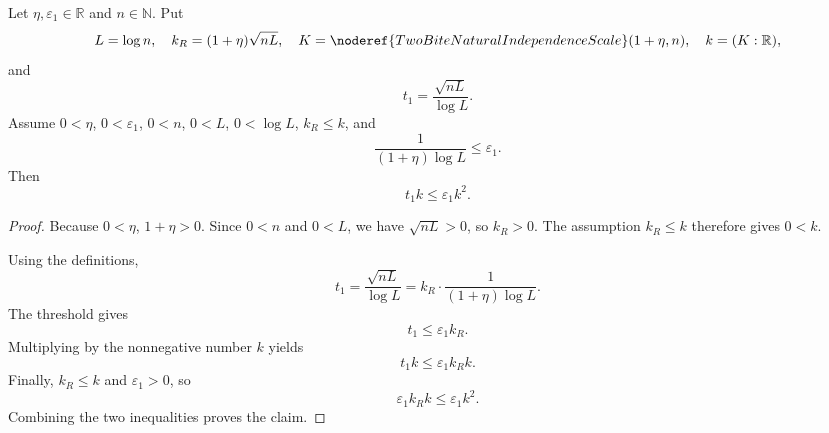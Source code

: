 \begin{helper}
Let \(\eta,\varepsilon_1\in\mathbb R\) and \(n\in\mathbb N\).  Put
\[
L=\log n,\quad
k_R=(1+\eta)\sqrt{nL},\quad
K=\noderef{TwoBiteNaturalIndependenceScale}(1+\eta,n),\quad
k=(K:\mathbb R),
\]
and
\[
t_1=\frac{\sqrt{nL}}{\log L}.
\]
Assume \(0<\eta\), \(0<\varepsilon_1\), \(0<n\), \(0<L\), \(0<\log L\),
\(k_R\le k\), and
\[
\frac1{(1+\eta)\log L}\le\varepsilon_1.
\]
Then
\[
t_1k\le\varepsilon_1 k^2.
\]
\end{helper}
\begin{proof}
Because \(0<\eta\), \(1+\eta>0\).  Since \(0<n\) and \(0<L\), we have
\(\sqrt{nL}>0\), so \(k_R>0\).  The assumption \(k_R\le k\) therefore gives
\(0<k\).

Using the definitions,
\[
t_1=\frac{\sqrt{nL}}{\log L}
=k_R\cdot\frac1{(1+\eta)\log L}.
\]
The threshold gives
\[
t_1\le \varepsilon_1 k_R.
\]
Multiplying by the nonnegative number \(k\) yields
\[
t_1k\le \varepsilon_1 k_Rk.
\]
Finally, \(k_R\le k\) and \(\varepsilon_1>0\), so
\[
\varepsilon_1 k_Rk\le \varepsilon_1 k^2.
\]
Combining the two inequalities proves the claim.
\end{proof}
